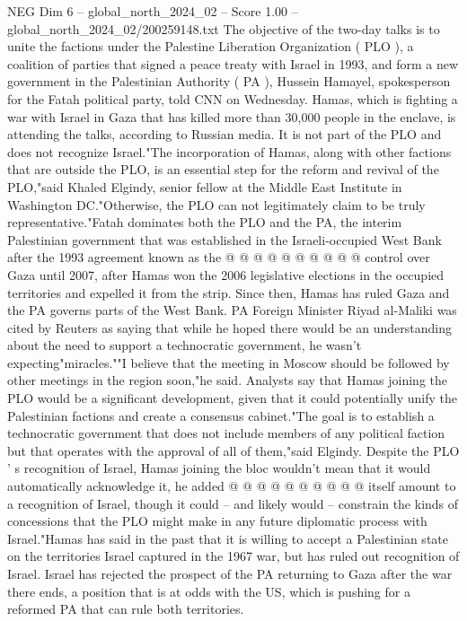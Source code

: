 \begin{textsample}{NEG Dim 6 – global\_north\_2024\_02 – Score 1.00 – global\_north\_2024\_02/200259148.txt}  \label{ex:f6_neg_286}
The objective of the two-day talks is to unite the factions under the Palestine Liberation Organization ( PLO ), a coalition of parties that signed a peace treaty with Israel in 1993, and form a new government in the Palestinian Authority ( PA ), Hussein Hamayel, spokesperson for the Fatah political party, told CNN on Wednesday.
Hamas, which is fighting a war with Israel in Gaza that has killed more than 30,000 people in the enclave, is attending the talks, according to Russian media.
It is not part of the PLO and does not recognize Israel."The incorporation of Hamas, along with other factions that are outside the PLO, is an essential step for the reform and revival of the PLO,"said Khaled Elgindy, senior fellow at the Middle East Institute in Washington DC."Otherwise, the PLO can not legitimately claim to be truly representative."Fatah dominates both the PLO and the PA, the interim Palestinian government that was established in the Israeli-occupied West Bank after the 1993 agreement known as the @ @ @ @ @ @ @ @ @ @ control over Gaza until 2007, after Hamas won the 2006 legislative elections in the occupied territories and expelled it from the strip.
Since then, Hamas has ruled Gaza and the PA governs parts of the West Bank.
PA Foreign Minister Riyad al-Maliki was cited by Reuters as saying that while he hoped there would be an understanding about the need to support a technocratic government, he wasn't expecting"miracles.""I believe that the meeting in Moscow should be followed by other meetings in the region soon,"he said.
Analysts say that Hamas joining the PLO would be a significant development, given that it could potentially unify the Palestinian factions and create a consensus cabinet."The goal is to establish a technocratic government that does not include members of any political faction but that operates with the approval of all of them,"said Elgindy.
Despite the PLO ' s recognition of Israel, Hamas joining the bloc wouldn't mean that it would automatically acknowledge it, he added @ @ @ @ @ @ @ @ @ @ itself amount to a recognition of Israel, though it could -- and likely would -- constrain the kinds of concessions that the PLO might make in any future diplomatic process with Israel."Hamas has said in the past that it is willing to accept a Palestinian state on the territories Israel captured in the 1967 war, but has ruled out recognition of Israel.
Israel has rejected the prospect of the PA returning to Gaza after the war there ends, a position that is at odds with the US, which is pushing for a reformed PA that can rule both territories.

\end{textsample}
